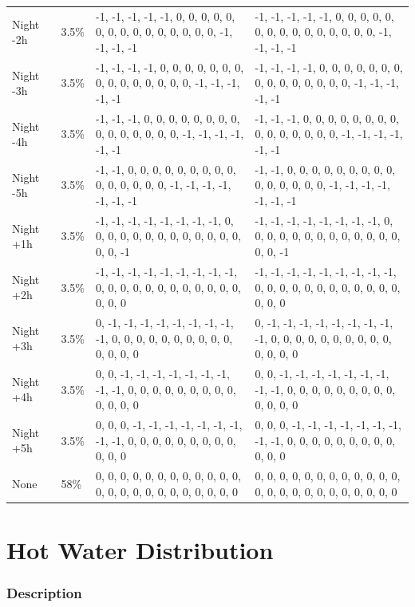 \begin{longtable}[]{@{}llll@{}}
Night -2h & 3.5\% & -1, -1, -1, -1, -1, 0, 0, 0, 0, 0, 0, 0, 0, 0, 0, 0,
0, 0, 0, 0, -1, -1, -1, -1 & -1, -1, -1, -1, -1, 0, 0, 0, 0, 0, 0, 0, 0,
0, 0, 0, 0, 0, 0, 0, -1, -1, -1, -1 \\
Night -3h & 3.5\% & -1, -1, -1, -1, 0, 0, 0, 0, 0, 0, 0, 0, 0, 0, 0, 0,
0, 0, 0, -1, -1, -1, -1, -1 & -1, -1, -1, -1, 0, 0, 0, 0, 0, 0, 0, 0, 0,
0, 0, 0, 0, 0, 0, -1, -1, -1, -1, -1 \\
Night -4h & 3.5\% & -1, -1, -1, 0, 0, 0, 0, 0, 0, 0, 0, 0, 0, 0, 0, 0,
0, 0, -1, -1, -1, -1, -1, -1 & -1, -1, -1, 0, 0, 0, 0, 0, 0, 0, 0, 0, 0,
0, 0, 0, 0, 0, -1, -1, -1, -1, -1, -1 \\
Night -5h & 3.5\% & -1, -1, 0, 0, 0, 0, 0, 0, 0, 0, 0, 0, 0, 0, 0, 0, 0,
-1, -1, -1, -1, -1, -1, -1 & -1, -1, 0, 0, 0, 0, 0, 0, 0, 0, 0, 0, 0, 0,
0, 0, 0, -1, -1, -1, -1, -1, -1, -1 \\
Night +1h & 3.5\% & -1, -1, -1, -1, -1, -1, -1, -1, 0, 0, 0, 0, 0, 0, 0,
0, 0, 0, 0, 0, 0, 0, 0, -1 & -1, -1, -1, -1, -1, -1, -1, -1, 0, 0, 0, 0,
0, 0, 0, 0, 0, 0, 0, 0, 0, 0, 0, -1 \\
Night +2h & 3.5\% & -1, -1, -1, -1, -1, -1, -1, -1, -1, 0, 0, 0, 0, 0,
0, 0, 0, 0, 0, 0, 0, 0, 0, 0 & -1, -1, -1, -1, -1, -1, -1, -1, -1, 0, 0,
0, 0, 0, 0, 0, 0, 0, 0, 0, 0, 0, 0, 0 \\
Night +3h & 3.5\% & 0, -1, -1, -1, -1, -1, -1, -1, -1, -1, 0, 0, 0, 0,
0, 0, 0, 0, 0, 0, 0, 0, 0, 0 & 0, -1, -1, -1, -1, -1, -1, -1, -1, -1, 0,
0, 0, 0, 0, 0, 0, 0, 0, 0, 0, 0, 0, 0 \\
Night +4h & 3.5\% & 0, 0, -1, -1, -1, -1, -1, -1, -1, -1, -1, 0, 0, 0,
0, 0, 0, 0, 0, 0, 0, 0, 0, 0 & 0, 0, -1, -1, -1, -1, -1, -1, -1, -1, -1,
0, 0, 0, 0, 0, 0, 0, 0, 0, 0, 0, 0, 0 \\
Night +5h & 3.5\% & 0, 0, 0, -1, -1, -1, -1, -1, -1, -1, -1, -1, 0, 0,
0, 0, 0, 0, 0, 0, 0, 0, 0, 0 & 0, 0, 0, -1, -1, -1, -1, -1, -1, -1, -1,
-1, 0, 0, 0, 0, 0, 0, 0, 0, 0, 0, 0, 0 \\
None & 58\% & 0, 0, 0, 0, 0, 0, 0, 0, 0, 0, 0, 0, 0, 0, 0, 0, 0, 0, 0,
0, 0, 0, 0, 0 & 0, 0, 0, 0, 0, 0, 0, 0, 0, 0, 0, 0, 0, 0, 0, 0, 0, 0, 0,
0, 0, 0, 0, 0 \\
\end{longtable}


\section{Hot Water Distribution}\label{hot_water_distribution}

\subsubsection{Description}\label{description-92}

